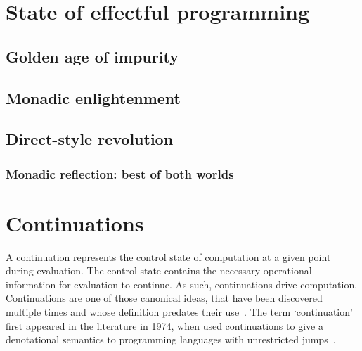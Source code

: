 \documentclass[12pt,phd,lfcs,twoside,openright,logo,leftchapter,normalheadings]{infthesis}
\theoremstyle{plain}
\theoremstyle{definition}
\begin{document}
\chapter{State of effectful programming}
\label{ch:related-work}

\section{Golden age of impurity}
\section{Monadic enlightenment}
\section{Direct-style revolution}

\subsection{Monadic reflection: best of both worlds}

\chapter{Continuations}
\label{ch:continuations}

A continuation represents the control state of computation at a given
point during evaluation. The control state contains the necessary
operational information for evaluation to continue. As such,
continuations drive computation. %
%
Continuations are one of those canonical ideas, that have been
discovered multiple times and whose definition predates their
use~\cite{Reynolds93}. The term `continuation' first appeared in the
literature in 1974, when \citet{StracheyW74} used continuations to
give a denotational semantics to programming languages with
unrestricted jumps~\cite{StracheyW00}.
\end{document}
